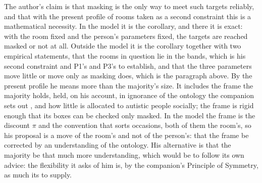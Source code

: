 The author's claim is that masking is the only way to meet such targets reliably, and that with the present profile of rooms taken as a second constraint this is a mathematical necessity. In the model it is the corollary, and there it is exact: with the room fixed and the person's parameters fixed, the targets are reached masked or not at all. Outside the model it is the corollary together with two empirical statements, that the rooms in question lie in the bands, which is his second constraint and P1's and P3's to establish, and that the three parameters move little or move only as masking does, which is the paragraph above. By the present profile he means more than the majority's size. It includes the frame the majority holds, held, on his account, in ignorance of the ontology the companion sets out \cite{NormCost}, and how little is allocated to autistic people socially; the frame is rigid enough that its boxes can be checked only masked. In the model the frame is the discount $\pi$ and the convention that sorts occasions, both of them the room's, so his proposal is a move of the room's and not of the person's: that the frame be corrected by an understanding of the ontology. His alternative is that the majority be that much more understanding, which would be to follow its own advice: the flexibility it asks of him is, by the companion's Principle of Symmetry, as much its to supply.
